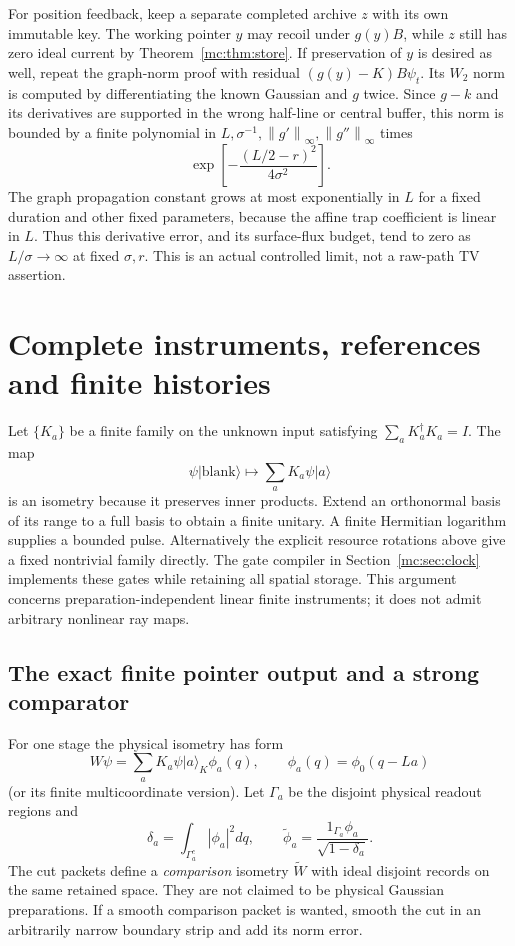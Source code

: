 \documentclass[11pt,oneside,openany]{book}
\theoremstyle{definition}
\theoremstyle{remark}\newtheorem{remark}[theorem]{Remark}
\providecommand{\ket}[1]{\lvert#1\rangle}
\providecommand{\norm}[1]{\left\lVert#1\right\rVert}
\begin{document}
For position feedback, keep a separate completed archive $z$ with its own immutable key. The working pointer $y$ may recoil under $g(y)B$, while $z$ still has zero ideal current by Theorem~\ref{mc:thm:store}. If preservation of $y$ is desired as well, repeat the graph-norm proof with residual $(g(y)-K)B\psi_t$. Its $W_2$ norm is computed by differentiating the known Gaussian and $g$ twice. Since $g-k$ and its derivatives are supported in the wrong half-line or central buffer, this norm is bounded by a finite polynomial in $L,\sigma^{-1},\norm{g'}_\infty,\norm{g''}_\infty$ times
\[
 \exp\left[-\frac{(L/2-r)^2}{4\sigma^2}\right].
\]
The graph propagation constant grows at most exponentially in $L$ for a fixed duration and other fixed parameters, because the affine trap coefficient is linear in $L$. Thus this derivative error, and its surface-flux budget, tend to zero as $L/\sigma\to\infty$ at fixed $\sigma,r$. This is an actual controlled limit, not a raw-path TV assertion.

\section{Complete instruments, references and finite histories}
\label{mc:sec:complete}
Let $\{K_a\}$ be a finite family on the unknown input satisfying $\sum_aK_a^\dagger K_a=I$. The map
\[
 \psi\ket{\mathrm{blank}}\longmapsto\sum_aK_a\psi\ket a
\]
is an isometry because it preserves inner products. Extend an orthonormal basis of its range to a full basis to obtain a finite unitary. A finite Hermitian logarithm supplies a bounded pulse. Alternatively the explicit resource rotations above give a fixed nontrivial family directly. The gate compiler in Section~\ref{mc:sec:clock} implements these gates while retaining all spatial storage. This argument concerns preparation-independent linear finite instruments; it does not admit arbitrary nonlinear ray maps.

\subsection{The exact finite pointer output and a strong comparator}
For one stage the physical isometry has form
\begin{equation}\label{mc:eq:W}
 W\psi=\sum_a K_a\psi\ket a_K\phi_a(q),
 \qquad\phi_a(q)=\phi_0(q-La)
\end{equation}
(or its finite multicoordinate version). Let $\Gamma_a$ be the disjoint physical readout regions and
\[
 \delta_a=\int_{\Gamma_a^c}|\phi_a|^2dq,\qquad
 \widetilde\phi_a=\frac{1_{\Gamma_a}\phi_a}{\sqrt{1-\delta_a}}.
\]
The cut packets define a \emph{comparison} isometry $\widetilde W$ with ideal disjoint records on the same retained space. They are not claimed to be physical Gaussian preparations. If a smooth comparison packet is wanted, smooth the cut in an arbitrarily narrow boundary strip and add its norm error.
\end{document}
